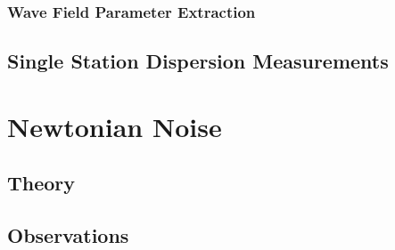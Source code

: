 \documentclass [12pt, proquest]{uwthesis}[2019]
\begin{document}
\subsubsection{Wave Field Parameter Extraction}
\subsection{Single Station Dispersion Measurements}
\section{Newtonian Noise}
\subsection{Theory}
\subsection{Observations}



\printendnotes
\nocite{*}   


\end{document}
